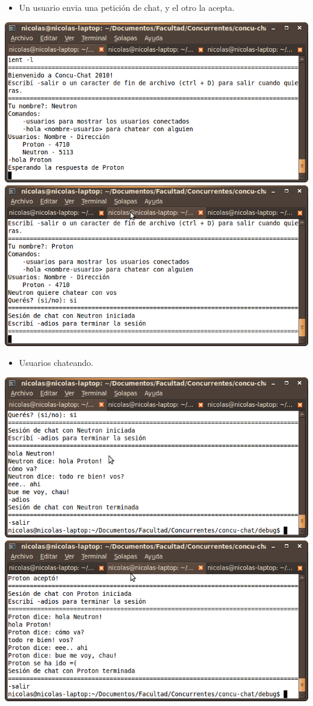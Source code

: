 \begin{itemize}
  \item Un usuario envia una petición de chat, y el otro la acepta.
\end{itemize}
\begin{center}
  \small\includegraphics[scale=0.65]{./Images/Conver3}
  \small\includegraphics[scale=0.65]{./Images/Conver4}
\end{center}

\begin{itemize}
  \item Usuarios chateando.
\end{itemize}
\begin{center}
  \small\includegraphics[scale=0.65]{./Images/Conver5}
  \small\includegraphics[scale=0.65]{./Images/Conver6}
\end{center}

